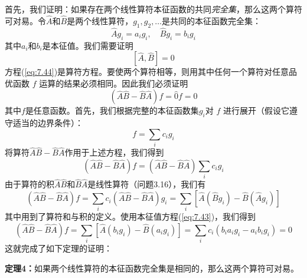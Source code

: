     首先，我们证明：如果存在两个线性算符本征函数的共同\textit{完全集}，那么这两个算符可对易。令$\hat{A}$和$\hat{B}$是两个线性算符，$g_1,g_2,\ldots$是共同的本征函数完全集：
    \begin{equation}
        \hat{A}g_i = a_ig_i, \quad \hat{B}g_i = b_ig_i
        \label{eq:7.43}
    \end{equation}
    其中$a_i$和$b_i$是本征值。我们需要证明
    \begin{equation}
        \left[\hat{A},\hat{B}\right] = 0
        \label{eq:7.44}
    \end{equation}
    方程(\ref{eq:7.44})是算符方程。要使两个算符相等，则用其中任何一个算符对任意品优函数 $f$ 运算的结果必须相同。因此我们必须证明
    \begin{equation*}
        \left(\hat{A}\hat{B} - \hat{B}\hat{A}\right)f = \hat{0}f = 0
    \end{equation*}
    其中$f$是任意函数。首先，我们根据完整的本征函数集$g_i$对 $f$ 进行展开（假设它遵守适当的边界条件）：
    \begin{equation*}
        f = \sum_{i}c_i g_i
    \end{equation*}
    将算符$\hat{A}\hat{B}-\hat{B}\hat{A}$作用于上述方程，我们得到
    \begin{equation*}
        \left(\hat{A}\hat{B} - \hat{B}\hat{A}\right)f = \left(\hat{A}\hat{B} - \hat{B}\hat{A}\right)\sum_{i}c_ig_i
    \end{equation*}
    由于算符的积$\hat{A}\hat{B}$和$\hat{B}\hat{A}$是线性算符（问题3.16），我们有
    \begin{equation*}
        \left(\hat{A}\hat{B}-\hat{B}\hat{A}\right)f = \sum_{i}c_i\left(\hat{A}\hat{B}-\hat{B}\hat{A}\right)g_i = \sum_{i}\left[\hat{A}\left(\hat{B}g_i\right) - \hat{B}\left(\hat{A}g_i\right)\right]
    \end{equation*}
    其中用到了算符和与积的定义。使用本征值方程(\ref{eq:7.43})，我们得到
    \begin{equation*}
        \left(\hat{A}\hat{B}-\hat{B}\hat{A}\right)f = \sum_{i}\left[\hat{A}\left(b_ig_i\right)- \hat{B}\left(a_ig_i\right)\right] = \sum_{i}c_i\left(b_ia_ig_i - a_ib_ig_i\right) = 0
    \end{equation*}
    这就完成了如下定理的证明：
    \begin{center}
        \parbox{0.8\textwidth}{
            \centering
            \textbf{定理4：}如果两个线性算符的本征函数完全集是相同的，那么这两个算符可对易。
        }
    \end{center}

